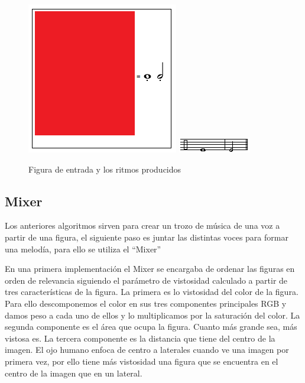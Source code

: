 		\begin{figure}[htbp]
		\centering
		\hspace*{0.0in}
		\includegraphics[scale=1]{graphics/simpletest2-F2F3_3.png}
		\includegraphics[scale=1]{graphics/simpletest2-PERpartitura.png}
		\caption{Figura de entrada y los ritmos producidos}
		\label{fig:Figura3Voz4}
		\end{figure}


\subsection{Mixer}

Los anteriores algoritmos sirven para crear un trozo de música de una voz a partir de una figura, el siguiente paso es juntar las distintas voces para formar una melodía, para ello se utiliza el ``Mixer''

En una primera implementación el Mixer se encargaba de ordenar las figuras en orden de relevancia siguiendo el parámetro de vistosidad calculado a partir de tres características de la figura.
La primera es lo vistosidad del color de la figura. Para ello descomponemos el color en sus tres componentes principales RGB y damos peso a cada uno de ellos y lo multiplicamos por la saturación del color.
La segunda componente es el área que ocupa la figura. Cuanto más grande sea, más vistosa es.
La tercera componente es la distancia que tiene del centro de la imagen. El ojo humano enfoca de centro a laterales cuando ve una imagen por primera vez, por ello tiene más vistosidad una figura que se encuentra en el centro de la imagen que en un lateral.

